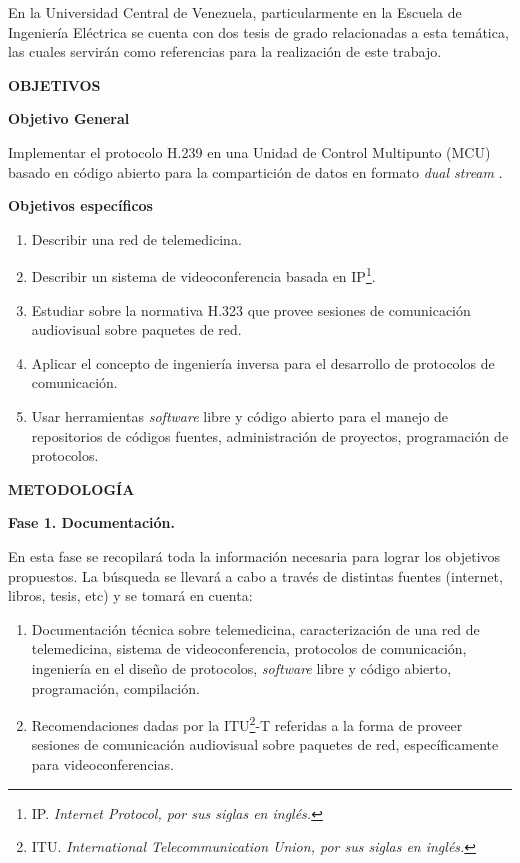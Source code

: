 \documentclass[12pt,letterpaper]{article}
\begin{document}
En la Universidad Central de Venezuela, particularmente en la Escuela de Ingeniería Eléctrica se cuenta con dos tesis de grado relacionadas a esta temática\cite{Max}\cite{Sarif}, las cuales servirán como referencias  para la realización de este trabajo.

\centerline{\textbf{OBJETIVOS}}

\textbf{Objetivo General}

Implementar el protocolo H.239 en una Unidad de Control Multipunto (MCU) basado en código abierto para la compartición de datos en formato \emph{dual stream} .

\textbf{Objetivos específicos}	
	\begin{enumerate}
	\item Describir una red de telemedicina.
	\item Describir un sistema de videoconferencia basada en IP\footnote{IP. \emph{Internet Protocol, por sus siglas en inglés.}}.
	\item Estudiar sobre la normativa H.323 que provee sesiones de comunicación audiovisual sobre paquetes de red.
	\item Aplicar el concepto de ingeniería inversa para el desarrollo de protocolos de comunicación.
	\item Usar herramientas \emph{software} libre y código abierto para el manejo de repositorios de códigos fuentes, administración de proyectos, programación de protocolos.
	\end{enumerate}

\centerline{\textbf{METODOLOGÍA}}

\textbf{Fase 1. Documentación.}

En esta fase se recopilará toda la información necesaria para lograr los objetivos propuestos. La búsqueda se llevará a cabo a través de distintas fuentes (internet, libros, tesis, etc) y se tomará en cuenta:
\begin{enumerate}
\item Documentación técnica sobre telemedicina, caracterización de una red de telemedicina, sistema de videoconferencia, protocolos de comunicación, ingeniería en el diseño de protocolos, \emph{software} libre y código abierto, programación, compilación.  
\item Recomendaciones  dadas por la ITU\footnote{ITU. \emph{International Telecommunication Union, por sus siglas en inglés.}}-T referidas a la forma de proveer sesiones de comunicación audiovisual sobre paquetes de red, específicamente para videoconferencias.
\end{enumerate}
\end{document}
